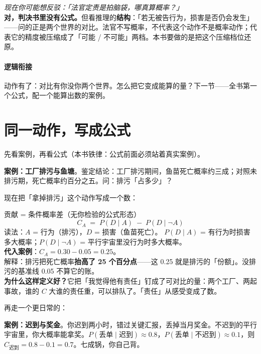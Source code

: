 \documentclass[../../main2.tex]{subfiles}
\begin{document}
\begin{questionbox}
	\textit{现在你可能想反驳：「法官定责是拍脑袋，哪真算概率？」}\\
	\textbf{对，判决书里没有公式。}但看推理的\textbf{结构}：「若无被告行为，损害是否仍会发生」——问的正是两个世界的对比。法官不写概率，不代表这个动作不是概率动作；代表它的精度被压缩成了「可能 / 不可能」两档。本书要做的是把这个压缩档位还原。
\end{questionbox}

\paragraph*{逻辑衔接}
	动作有了：对比有你没你两个世界。怎么把它变成能算的量？下一节——全书第一个公式，配一个能算出数的案例。

\section{同一动作，写成公式}
\label{sec:butfor-formula}

先看案例，再看公式（本书铁律：公式前面必须站着真实案例）。

\begin{examplebox}
	\textbf{案例：工厂排污与鱼塘}。鉴定结论：工厂排污期间，鱼苗死亡概率约三成；对照未排污期，死亡概率约百分之五。问：排污「占多少」？
\end{examplebox}

现在把「拿掉排污」这个动作写成一个数：

\begin{mathbox}{贡献 = 条件概率差（无你检验的公式形态）}
	\[
	C_A \;=\; P(D \mid A) \;-\; P(D \mid \neg A)
	\]
	读法：$A$ = 行为（排污），$D$ = 损害（鱼苗死亡）。
	$P(D \mid A)$ = 有行为时损害多大概率；$P(D \mid \neg A)$ = 平行宇宙里没行为时多大概率。\\[0.5em]
	\textbf{代入案例}：$C_A = 0.30 - 0.05 = 0.25$。\\
	解释：排污把死亡概率\textbf{抬高了 25 个百分点}——这 0.25 就是排污的「份额」。没排污的基准线 0.05 不算它的账。\\[0.5em]
	\textbf{为什么这样定义好？}它把「我觉得他有责任」钉成了可对比的量：两个工厂、两起事故，谁的 $C$ 大谁的责任重，可以排队了。「责任」从感受变成了数。
\end{mathbox}


再走一个更日常的：

\begin{examplebox}
	\textbf{案例：迟到与奖金}。你迟到两小时，错过关键汇报，丢掉当月奖金。不迟到的平行宇宙里，你大概率能拿奖。$P(\text{丢单} \mid \text{迟到}) \approx 0.8$，$P(\text{丢单} \mid \text{不迟到}) \approx 0.1$，则 $C_{\text{迟到}} = 0.8 - 0.1 = 0.7$。七成锅，你自己背。
\end{examplebox}
\end{document}
